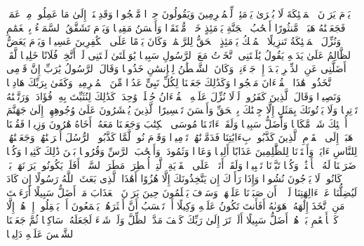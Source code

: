 \stopbuffer
\startbuffer[\q:25:22]
یَوۡمَ یَرَوۡنَ ٱلۡمَلَٰۤئِكَةَ لَا بُشۡرَىٰ یَوۡمَئِذࣲ لِّلۡمُجۡرِمِینَ وَیَقُولُونَ حِجۡرࣰا مَّحۡجُورࣰا%
\stopbuffer
\startbuffer[\q:25:23]
وَقَدِمۡنَاۤ إِلَىٰ مَا عَمِلُوا۟ مِنۡ عَمَلࣲ فَجَعَلۡنَٰهُ هَبَاۤءࣰ مَّنثُورًا%
\stopbuffer
\startbuffer[\q:25:24]
أَصۡحَٰبُ ٱلۡجَنَّةِ یَوۡمَئِذٍ خَیۡرࣱ مُّسۡتَقَرࣰّا وَأَحۡسَنُ مَقِیلࣰا%
\stopbuffer
\startbuffer[\q:25:25]
وَیَوۡمَ تَشَقَّقُ ٱلسَّمَاۤءُ بِٱلۡغَمَٰمِ وَنُزِّلَ ٱلۡمَلَٰۤئِكَةُ تَنزِیلًا%
\stopbuffer
\startbuffer[\q:25:26]
ٱلۡمُلۡكُ یَوۡمَئِذٍ ٱلۡحَقُّ لِلرَّحۡمَٰنِۚ وَكَانَ یَوۡمًا عَلَى ٱلۡكَٰفِرِینَ عَسِیرࣰا%
\stopbuffer
\startbuffer[\q:25:27]
وَیَوۡمَ یَعَضُّ ٱلظَّالِمُ عَلَىٰ یَدَیۡهِ یَقُولُ یَٰلَیۡتَنِی ٱتَّخَذۡتُ مَعَ ٱلرَّسُولِ سَبِیلࣰا%
\stopbuffer
\startbuffer[\q:25:28]
یَٰوَیۡلَتَىٰ لَیۡتَنِی لَمۡ أَتَّخِذۡ فُلَانًا خَلِیلࣰا%
\stopbuffer
\startbuffer[\q:25:29]
لَّقَدۡ أَضَلَّنِی عَنِ ٱلذِّكۡرِ بَعۡدَ إِذۡ جَاۤءَنِیۗ وَكَانَ ٱلشَّیۡطَٰنُ لِلۡإِنسَٰنِ خَذُولࣰا%
\stopbuffer
\startbuffer[\q:25:30]
وَقَالَ ٱلرَّسُولُ یَٰرَبِّ إِنَّ قَوۡمِی ٱتَّخَذُوا۟ هَٰذَا ٱلۡقُرۡءَانَ مَهۡجُورࣰا%
\stopbuffer
\startbuffer[\q:25:31]
وَكَذَٰلِكَ جَعَلۡنَا لِكُلِّ نَبِیٍّ عَدُوࣰّا مِّنَ ٱلۡمُجۡرِمِینَۗ وَكَفَىٰ بِرَبِّكَ هَادِیࣰا وَنَصِیرࣰا%
\stopbuffer
\startbuffer[\q:25:32]
وَقَالَ ٱلَّذِینَ كَفَرُوا۟ لَوۡلَا نُزِّلَ عَلَیۡهِ ٱلۡقُرۡءَانُ جُمۡلَةࣰ وَٰحِدَةࣰۚ كَذَٰلِكَ لِنُثَبِّتَ بِهِۦ فُؤَادَكَۖ وَرَتَّلۡنَٰهُ تَرۡتِیلࣰا%
\stopbuffer
\startbuffer[\q:25:33]
وَلَا یَأۡتُونَكَ بِمَثَلٍ إِلَّا جِئۡنَٰكَ بِٱلۡحَقِّ وَأَحۡسَنَ تَفۡسِیرًا%
\stopbuffer
\startbuffer[\q:25:34]
ٱلَّذِینَ یُحۡشَرُونَ عَلَىٰ وُجُوهِهِمۡ إِلَىٰ جَهَنَّمَ أُو۟لَٰۤئِكَ شَرࣱّ مَّكَانࣰا وَأَضَلُّ سَبِیلࣰا%
\stopbuffer
\startbuffer[\q:25:35]
وَلَقَدۡ ءَاتَیۡنَا مُوسَى ٱلۡكِتَٰبَ وَجَعَلۡنَا مَعَهُۥۤ أَخَاهُ هَٰرُونَ وَزِیرࣰا%
\stopbuffer
\startbuffer[\q:25:36]
فَقُلۡنَا ٱذۡهَبَاۤ إِلَى ٱلۡقَوۡمِ ٱلَّذِینَ كَذَّبُوا۟ بِءَایَٰتِنَا فَدَمَّرۡنَٰهُمۡ تَدۡمِیرࣰا%
\stopbuffer
\startbuffer[\q:25:37]
وَقَوۡمَ نُوحࣲ لَّمَّا كَذَّبُوا۟ ٱلرُّسُلَ أَغۡرَقۡنَٰهُمۡ وَجَعَلۡنَٰهُمۡ لِلنَّاسِ ءَایَةࣰۖ وَأَعۡتَدۡنَا لِلظَّٰلِمِینَ عَذَابًا أَلِیمࣰا%
\stopbuffer
\startbuffer[\q:25:38]
وَعَادࣰا وَثَمُودَا۟ وَأَصۡحَٰبَ ٱلرَّسِّ وَقُرُونَۢا بَیۡنَ ذَٰلِكَ كَثِیرࣰا%
\stopbuffer
\startbuffer[\q:25:39]
وَكُلࣰّا ضَرَبۡنَا لَهُ ٱلۡأَمۡثَٰلَۖ وَكُلࣰّا تَبَّرۡنَا تَتۡبِیرࣰا%
\stopbuffer
\startbuffer[\q:25:40]
وَلَقَدۡ أَتَوۡا۟ عَلَى ٱلۡقَرۡیَةِ ٱلَّتِیۤ أُمۡطِرَتۡ مَطَرَ ٱلسَّوۡءِۚ أَفَلَمۡ یَكُونُوا۟ یَرَوۡنَهَاۚ بَلۡ كَانُوا۟ لَا یَرۡجُونَ نُشُورࣰا%
\stopbuffer
\startbuffer[\q:25:41]
وَإِذَا رَأَوۡكَ إِن یَتَّخِذُونَكَ إِلَّا هُزُوًا أَهَٰذَا ٱلَّذِی بَعَثَ ٱللَّهُ رَسُولًا%
\stopbuffer
\startbuffer[\q:25:42]
إِن كَادَ لَیُضِلُّنَا عَنۡ ءَالِهَتِنَا لَوۡلَاۤ أَن صَبَرۡنَا عَلَیۡهَاۚ وَسَوۡفَ یَعۡلَمُونَ حِینَ یَرَوۡنَ ٱلۡعَذَابَ مَنۡ أَضَلُّ سَبِیلًا%
\stopbuffer
\startbuffer[\q:25:43]
أَرَءَیۡتَ مَنِ ٱتَّخَذَ إِلَٰهَهُۥ هَوَىٰهُ أَفَأَنتَ تَكُونُ عَلَیۡهِ وَكِیلًا%
\stopbuffer
\startbuffer[\q:25:44]
أَمۡ تَحۡسَبُ أَنَّ أَكۡثَرَهُمۡ یَسۡمَعُونَ أَوۡ یَعۡقِلُونَۚ إِنۡ هُمۡ إِلَّا كَٱلۡأَنۡعَٰمِ بَلۡ هُمۡ أَضَلُّ سَبِیلًا%
\stopbuffer
\startbuffer[\q:25:45]
أَلَمۡ تَرَ إِلَىٰ رَبِّكَ كَیۡفَ مَدَّ ٱلظِّلَّ وَلَوۡ شَاۤءَ لَجَعَلَهُۥ سَاكِنࣰا ثُمَّ جَعَلۡنَا ٱلشَّمۡسَ عَلَیۡهِ دَلِیلࣰا%
\stopbuffer
